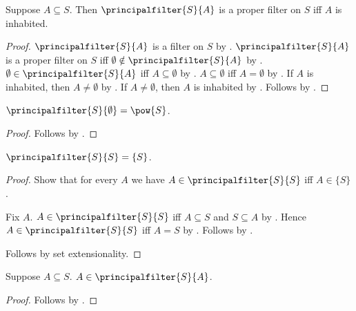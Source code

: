 \begin{theorem}\label{principalfilter_is_proper_iff}
    Suppose $A\subseteq S$.
    Then $\principalfilter{S}{A}$ is a proper filter on $S$ iff
        $A$ is inhabited.
\end{theorem}
\begin{proof}
    $\principalfilter{S}{A}$ is a filter on $S$
        by .
    $\principalfilter{S}{A}$ is a proper filter on $S$ iff
        $\emptyset\notin\principalfilter{S}{A}$
        by .
    $\emptyset\in\principalfilter{S}{A}$ iff $A\subseteq\emptyset$
        by .
    $A\subseteq\emptyset$ iff $A=\emptyset$
        by .
    If $A$ is inhabited, then $A\neq\emptyset$ by .
    If $A\neq\emptyset$, then $A$ is inhabited
        by .
    Follows by \auto.
\end{proof}

\begin{proposition}\label{principalfilter_emptyset}
    $\principalfilter{S}{\emptyset}=\pow{S}$.
\end{proposition}
\begin{proof}
    Follows by .
\end{proof}

\begin{proposition}\label{principalfilter_carrier}
    $\principalfilter{S}{S}=\{S\}$.
\end{proposition}
\begin{proof}
    Show that for every $A$ we have
        $A\in\principalfilter{S}{S}$ iff $A\in\{S\}$.
    \begin{subproof}
        Fix $A$.
        $A\in\principalfilter{S}{S}$ iff
            $A\subseteq S$ and $S\subseteq A$
            by .
        Hence $A\in\principalfilter{S}{S}$ iff $A=S$
            by .
        Follows by .
    \end{subproof}
    Follows by set extensionality.
\end{proof}

\begin{proposition}\label{principalfilter_elem_generator}
    Suppose $A\subseteq S$.
    $A\in\principalfilter{S}{A}$.
\end{proposition}
\begin{proof}
    Follows by .
\end{proof}

